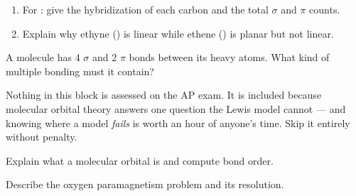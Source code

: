 \documentclass{apchem-notes}
\begin{document}

\begin{enumerate}[leftmargin=*,itemsep=0.4em]
  \item For : give the hybridization of each carbon and the
        total $\sigma$ and $\pi$ counts.
  \item Explain why ethyne () is linear while ethene
        () is planar but not linear.
\end{enumerate}

\begin{exitticket}
A molecule has 4 $\sigma$ and 2 $\pi$ bonds between its heavy atoms. What
kind of multiple bonding must it contain? 
\end{exitticket}


\begin{apcnote}
Nothing in this block is assessed on the AP exam. It is included because
molecular orbital theory answers one question the Lewis model cannot ---
and knowing where a model \emph{fails} is worth an hour of anyone's time.
Skip it entirely without penalty.
\end{apcnote}

\begin{objectives}
  \item Explain what a molecular orbital is and compute bond order.
  \item Describe the oxygen paramagnetism problem and its resolution.
\end{objectives}


\end{document}
